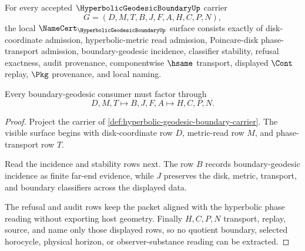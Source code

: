 \begin{theorem}
\label{thm:hyperbolic-geodesic-boundary-namecert-obligations}
For every accepted $\HyperbolicGeodesicBoundaryUp$ carrier
$$
G=(D,M,T,B,J,F,A,H,C,P,N),
$$
the local $\NameCert_{\HyperbolicGeodesicBoundaryUp}$ surface consists exactly of disk-coordinate admission, hyperbolic-metric read admission, Poincare-disk phase-transport admission, boundary-geodesic incidence, classifier stability, refusal exactness, audit provenance, componentwise $\hsame$ transport, displayed $\Cont$ replay, $\Pkg$ provenance, and local naming.

Every boundary-geodesic consumer must factor through
$$
D,M,T \longmapsto B,J,F,A \longmapsto H,C,P,N.
$$
\end{theorem}
\begin{proof}
Project the carrier of \autoref{def:hyperbolic-geodesic-boundary-carrier}. The visible surface begins with disk-coordinate row $D$, metric-read row $M$, and phase-transport row $T$.

Read the incidence and stability rows next. The row $B$ records boundary-geodesic incidence as finite far-end evidence, while $J$ preserves the disk, metric, transport, and boundary classifiers across the displayed data.

The refusal and audit rows keep the packet aligned with the hyperbolic phase reading without exporting host geometry. Finally $H,C,P,N$ transport, replay, source, and name only those displayed rows, so no quotient boundary, selected horocycle, physical horizon, or observer-substance reading can be extracted.
\end{proof}

